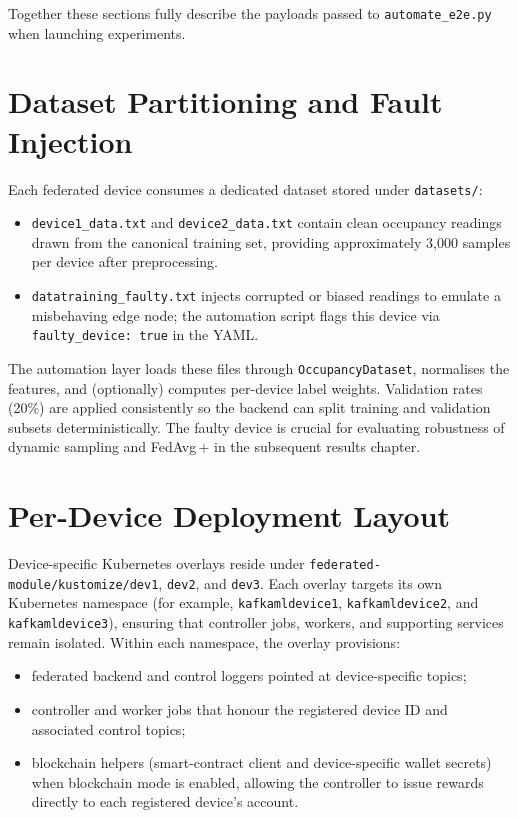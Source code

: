 Together these sections fully describe the payloads passed to \texttt{automate\_e2e.py} when launching experiments.

\section{Dataset Partitioning and Fault Injection}
\label{sec:dataset_partitioning}

Each federated device consumes a dedicated dataset stored under \texttt{datasets/}:

\begin{itemize}
    \item \texttt{device1\_data.txt} and \texttt{device2\_data.txt} contain clean occupancy readings drawn from the canonical training set, providing approximately 3{,}000 samples per device after preprocessing.
    \item \texttt{datatraining\_faulty.txt} injects corrupted or biased readings to emulate a misbehaving edge node; the automation script flags this device via \texttt{faulty\_device: true} in the YAML.
\end{itemize}

The automation layer loads these files through \texttt{OccupancyDataset}, normalises the features, and (optionally) computes per-device label weights. Validation rates (20\%) are applied consistently so the backend can split training and validation subsets deterministically. The faulty device is crucial for evaluating robustness of dynamic sampling and FedAvg\,+ in the subsequent results chapter.

\section{Per-Device Deployment Layout}
\label{sec:deployment_layout}

Device-specific Kubernetes overlays reside under \texttt{federated-module/kustomize/dev1}, \texttt{dev2}, and \texttt{dev3}. Each overlay targets its own Kubernetes namespace (for example, \texttt{kafkamldevice1}, \texttt{kafkamldevice2}, and \texttt{kafkamldevice3}), ensuring that controller jobs, workers, and supporting services remain isolated. Within each namespace, the overlay provisions:

\begin{itemize}
    \item federated backend and control loggers pointed at device-specific topics;
    \item controller and worker jobs that honour the registered device ID and associated control topics;
    \item blockchain helpers (smart-contract client and device-specific wallet secrets) when blockchain mode is enabled, allowing the controller to issue rewards directly to each registered device’s account.
\end{itemize}

